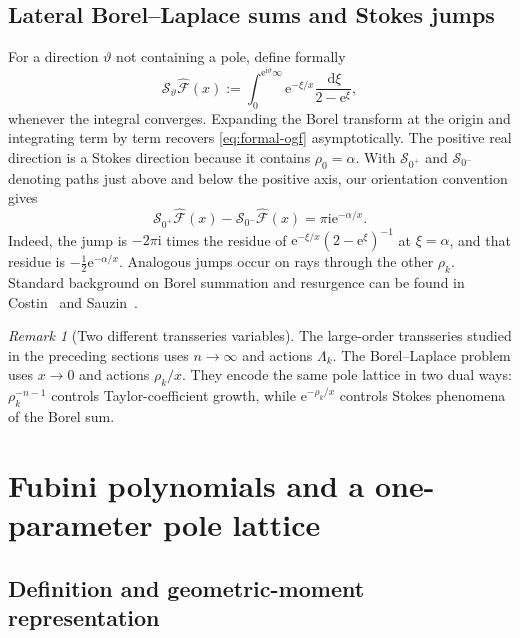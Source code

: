 \documentclass[11pt,a4paper]{article}
\theoremstyle{definition}
\theoremstyle{remark}
\newtheorem{remark}[theorem]{Remark}
\newcommand{\e}{\mathrm e}
\newcommand{\ii}{\mathrm i}
\newcommand{\dd}{\,\mathrm d}
\begin{document}
\subsection{Lateral Borel--Laplace sums and Stokes jumps}

For a direction \(\vartheta\) not containing a pole, define formally
\begin{equation}\label{eq:laplace}
 \mathcal S_\vartheta\widehat{\mathcal F}(x)
 :=\int_{0}^{\e^{\ii\vartheta}\infty}
 \e^{-\xi/x}\frac{\dd\xi}{2-\e^\xi},
\end{equation}
whenever the integral converges.  Expanding the Borel transform at the origin
and integrating term by term recovers \eqref{eq:formal-ogf} asymptotically.
The positive real direction is a Stokes direction because it contains
\(\rho_0=\alpha\).  With \(\mathcal S_{0^+}\) and
\(\mathcal S_{0^-}\) denoting paths just above and below the positive axis,
our orientation convention gives
\begin{equation}\label{eq:stokes-jump}
 \mathcal S_{0^+}\widehat{\mathcal F}(x)
 -\mathcal S_{0^-}\widehat{\mathcal F}(x)
 =\pi\ii\e^{-\alpha/x}.
\end{equation}
Indeed, the jump is \(-2\pi\ii\) times the residue of
\(
 \e^{-\xi/x}(2-\e^\xi)^{-1}
\) at \(\xi=\alpha\), and that residue is
\(-\tfrac12\e^{-\alpha/x}\).  Analogous jumps occur on rays through the other
\(\rho_k\).  Standard background on Borel summation and resurgence can be
found in Costin~\cite{Costin} and Sauzin~\cite{Sauzin}.

\begin{remark}[Two different transseries variables]
The large-order transseries studied in the preceding sections uses
\(n\to\infty\) and actions \(\Lambda_k\).  The Borel--Laplace problem uses
\(x\to0\) and actions \(\rho_k/x\).  They encode the same pole lattice in two
dual ways: \(\rho_k^{-n-1}\) controls Taylor-coefficient growth, while
\(\e^{-\rho_k/x}\) controls Stokes phenomena of the Borel sum.
\end{remark}

\section{Fubini polynomials and a one-parameter pole lattice}

\subsection{Definition and geometric-moment representation}
\end{document}
